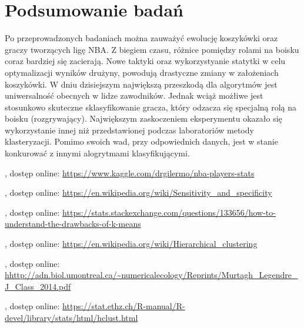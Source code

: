 \documentclass[twoside,twocolumn]{article}
\begin{document}

\section{Podsumowanie badań}

\indent Po przeprowadzonych badaniach można zauważyć ewolucję koszykówki oraz graczy tworzących ligę NBA. Z biegiem czasu, różnice pomiędzy rolami na boisku coraz bardziej się zacierają. Nowe taktyki oraz wykorzystyanie statytki w celu optymalizacji wyników drużyny, powodują drastyczne zmiany w założeniach koszykówki. W dniu dzisiejszym największą przeszkodą dla algorytmów jest uniwersalność obecnych w lidze zawodników. Jednak wciąż możłiwe jest stosunkowo skuteczne sklasyfikowanie gracza, który odzacza się specjalną rolą na boisku (rozgrywający). Największym zaskoczeniem eksperymentu okazało się wykorzystanie innej niż przedstawionej podczas laboratoriów metody klasteryzacji. Pomimo swoich wad, przy odpowiednich danych, jest w stanie konkurować z innymi alogrytmami klasyfikującymi.


\begin{thebibliography}{99} %

, dostęp online:
\newblock \url{https://www.kaggle.com/drgilermo/nba-players-stats} 

, dostęp online:
\newblock \url{https://en.wikipedia.org/wiki/Sensitivity_and_specificity}

, dostęp online:
\newblock \url{https://stats.stackexchange.com/questions/133656/how-to-understand-the-drawbacks-of-k-means} 

, dostęp online:
\newblock \url{https://en.wikipedia.org/wiki/Hierarchical_clustering} 

, dostęp online:
\newblock \url{hhttp://adn.biol.umontreal.ca/~numericalecology/Reprints/Murtagh_Legendre_J_Class_2014.pdf} 

, dostęp online:
\newblock \url{https://stat.ethz.ch/R-manual/R-devel/library/stats/html/hclust.html}
\end{thebibliography}

\end{document}

